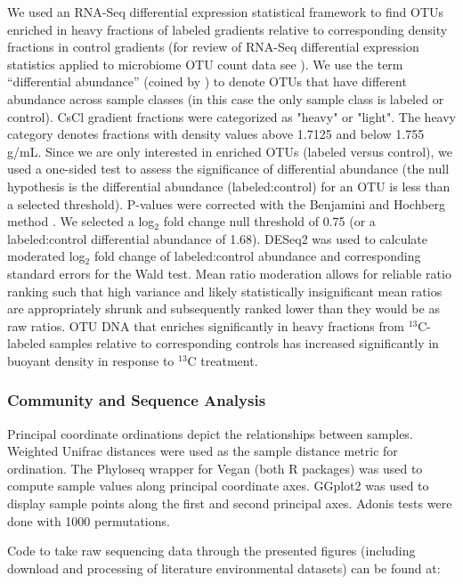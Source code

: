 We used an RNA-Seq differential expression statistical framework
\citep{Love_2014} to find OTUs enriched in heavy fractions of labeled
gradients relative to corresponding density fractions in control gradients
(for review of RNA-Seq differential expression statistics applied to
microbiome OTU count data see \citet{McMurdie_2014}). We use the term
“differential abundance” (coined by \citet{McMurdie_2014}) to denote OTUs that
have different abundance across sample classes (in this case the only sample
class is labeled or control). CsCl gradient fractions were categorized as
"heavy" or "light". The heavy category denotes fractions with density values
above 1.7125 and below 1.755 g/mL. Since we are only interested in enriched
OTUs (labeled versus control), we used a one-sided test to assess the
significance of differential abundance (the null hypothesis is the differential
abundance (labeled:control) for an OTU is less than a selected threshold).
P-values were corrected with the Benjamini and Hochberg method
\citep{Benjamini_1997}. We selected a log$_{2}$ fold change null threshold of
0.75 (or a labeled:control differential abundance of 1.68). DESeq2 was used to
calculate moderated log$_{2}$ fold change of labeled:control abundance and
corresponding standard errors for the Wald test. Mean ratio moderation allows
for reliable ratio ranking such that high variance and likely statistically
insignificant mean ratios are appropriately shrunk and subsequently ranked
lower than they would be as raw ratios. OTU DNA that enriches significantly in
heavy fractions from $^{13}$C-labeled samples relative to corresponding
controls has increased significantly in buoyant density in response to $^{13}$C
treatment.

\subsubsection{Community and Sequence Analysis}
Principal coordinate ordinations depict the relationships between
samples. Weighted Unifrac \citep{Lozupone_2005} distances were
used as the sample distance metric for ordination. The Phyloseq
\citep{McMurdie_2013} wrapper for Vegan \cite{Dixon_2003} (both R packages) was
used to compute sample values along principal coordinate axes. GGplot2
\cite{Wickham_2009} was used to display sample points along the first and
second principal axes. Adonis tests \cite{Anderson_2001} were done with 1000
permutations.

Code to take raw sequencing data through the presented figures (including
download and processing of literature environmental datasets) can be
found at:

